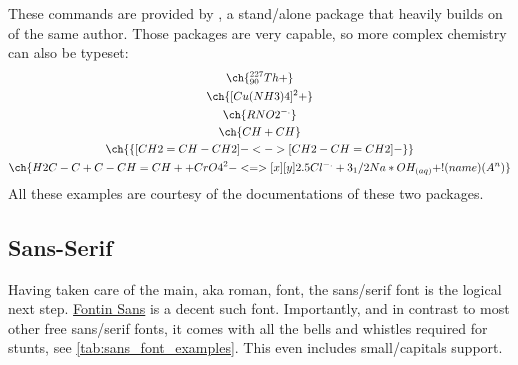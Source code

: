These commands are provided by , a stand\-/alone package
that heavily builds on  of the same author.
Those packages are very capable, so more complex chemistry can also be typeset:
\begin{gather*}
    \ch{^{227}_{90}Th+}\\
    \ch{[Cu(NH3)4]^2+}\\
    \ch{RNO2^{-.}}\\
    \ch{CH+CH}\\
    \ch{\{[CH2=CH-CH2]- <-> {}[CH2-CH=CH2]- \}}\\
    \ch{
        H2C-C+C-CH=CH+ + CrO4^2-
        <=>[x][y]
        2.5 Cl^{-.} + 3_1/2 Na*OH_{(aq)} + !(name)( A^n )
    }
\end{gather*}
All these examples are courtesy of the documentations of these two packages.

\subsection{Sans-Serif}

Having taken care of the main, aka roman, font, the sans\-/serif font is the
logical next step.
\href{https://www.exljbris.com/fontinsans.html}{Fontin Sans} is a decent such font.
Importantly, and in contrast to most other free sans\-/serif fonts, it comes with all
the bells and whistles required for stunts, see \cref{tab:sans_font_examples}.
This even includes small\-/capitals support.

\begin{table}\ContinuedFloat
\end{table}

